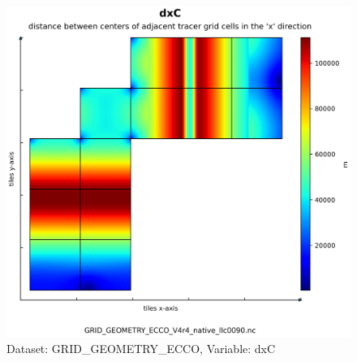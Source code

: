 \begin{figure}[H]
\centering
\includegraphics[scale=0.55]{../images/plots/native_plots_coords/Geometry_Parameters_for_the_Lat-Lon-Cap_90_(llc90)_Native_Model_Grid_(Version_4_Release_4)/dxC.png}
\caption{Dataset: GRID\_GEOMETRY\_ECCO, Variable: dxC}
\label{tab:table-GRID_GEOMETRY_ECCO_dxC-Plot}
\end{figure}
\pagebreak
